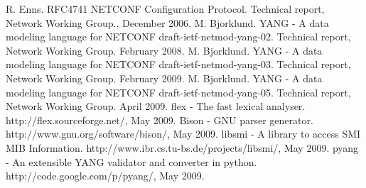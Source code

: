 \documentclass[conference]{IEEEtran}
\begin{document}
\begin{thebibliography}{1}
 R. Enns. RFC4741 NETCONF Configuration Protocol. Technical report, Network Working Group.,
December 2006.
 M. Bjorklund. YANG - A data modeling language for NETCONF draft-ietf-netmod-yang-02. Technical report, Network Working Group. February 2008.
 M. Bjorklund. YANG - A data modeling language for NETCONF draft-ietf-netmod-yang-03. Technical report, Network Working Group. February 2009.
 M. Bjorklund. YANG - A data modeling language for NETCONF draft-ietf-netmod-yang-05. Technical report, Network Working Group. April 2009.
 flex - The fast lexical analyser. http://flex.sourceforge.net/, May 2009.
 Bison - GNU parser generator. http://www.gnu.org/software/bison/, May 2009.
 libsmi - A library to access SMI MIB Information. http://www.ibr.cs.tu-bs.de/projects/libsmi/, May 2009.
 pyang - An extensible YANG validator and converter in python. http://code.google.com/p/pyang/, May 2009.

\end{thebibliography}
\end{document}
